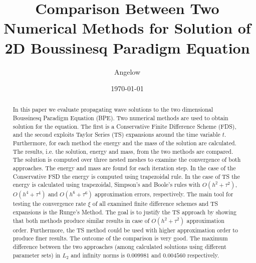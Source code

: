 \documentclass[%
 aip,
cp,  %
 amsmath,amssymb,%
 reprint,%
]{revtex4-2}
\begin{document}
\title{Comparison Between Two Numerical Methods for Solution of 2D Boussinesq Paradigm Equation}%

\author{Angelow} %

\date{\today} %

\begin{abstract}
In this paper we evaluate propagating wave solutions to the two dimensional Boussinesq Paradigm Equation (BPE).
Two numerical methods are used to obtain solution for the equation. The first is a Conservative Finite Difference Scheme (FDS), and the second exploits Taylor Series (TS) expansions around the time variable $t$. Furthermore, for each method the energy and the mass of the solution are calculated. The results, i.e. the solution, energy and mass, from the two methods are compared.
The solution is computed over three nested meshes to examine the convergence of both approaches. The energy and mass are found for each iteration step. In the case of the Conservative FSD the energy is computed using trapezoidal rule. In the case of TS the energy is calculated using trapezoidal, Simpson's and Boole's rules with $O(h^{2} + \tau^2 )$, $O(h^{4} + \tau^4 )$ and $O(h^{6} + \tau^6 )$ approximation errors, respectively. The main tool for testing the convergence rate $\xi$ of all examined finite difference schemes and TS expansions is the Runge's Method.
The goal is to justify the TS approach by showing that both methods produce similar results in case of $O(h^{2} + \tau^2 )$ approximation order. Furthermore, the TS method could be used with higher approximation order to produce finer results. The outcome of the comparison is very good. The maximum difference between the two approaches (among calculated solutions using different parameter sets) in $L_2$ and infinity norms is $0.009981$ and $0.004560$ respectively.

\end{abstract}

\maketitle
\end{document}
